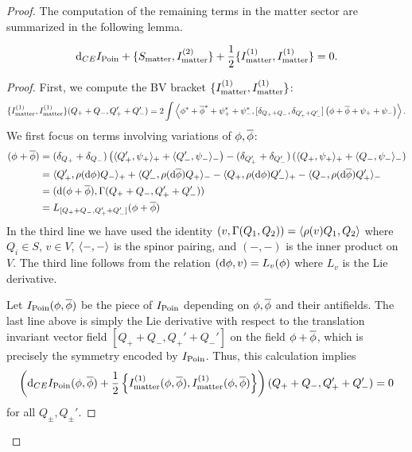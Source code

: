 \documentclass[10pt, oneside]{article}
\begin{document}
\begin{proof}
The computation of the remaining terms in the matter sector are summarized in the following lemma. 
\begin{lem}
\[
\d_{CE} I_{\rm Poin} + \{S_{\rm matter}, I_{\rm matter}^{(2)}\} + \frac{1}{2} \{I_{\rm matter}^{(1)}, I_{\rm matter}^{(1)}\} = 0.
\]
\end{lem}
\begin{proof}

First, we compute the BV bracket $\{I_{\rm matter}^{(1)}, I_{\rm matter}^{(1)}\}$:
\[
\{I^{(1)}_{\rm matter}, I^{(1)}_{\rm matter}\}(Q_+ + Q_-, Q_+' + Q_-') = 2 \int \left\<\phi^* + \Bar{\phi}^* + \psi^*_+ + \psi_-^*, [\delta_{Q_+ + Q_-}, \delta_{Q_+' + Q_-'}] \left(\phi + \Bar{\phi} + \psi_+ + \psi_-\right) \right\>  .
\]
We first focus on terms involving variations of $\phi, \Bar{\phi}$:
\begin{align*} 
[\delta_{Q_+ + Q_-}, \delta_{Q_+' + Q_-'}] (\phi + \Bar{\phi}) & = (\delta_{Q_+} + \delta_{Q_-}) \left(\<Q'_+, \psi_+\>_+ + \<Q'_-, \psi_-\>_-\right) - (\delta_{Q'_+} + \delta_{Q'_-}) \left(\<Q_+, \psi_+\>_+ + \<Q_-, \psi_-\>_-\right) \\ & = \<Q'_+, \rho(\d \phi) Q_-\>_+ + \<Q'_-, \rho(\d \Bar{\phi}) Q_+\>_- -  \<Q_+, \rho(\d \phi) Q'_-\>_+ - \<Q_-, \rho(\d \Bar{\phi}) Q'_+\>_- \\ & = (\d (\phi + \Bar{\phi}), \Gamma(Q_+ + Q_-, Q_+' + Q_-')) \\ & = L_{[Q_++Q_-, Q_+'+Q_-']} (\phi + \Bar{\phi}) %
\end{align*}
In the third line we have used the identity $(v, \Gamma(Q_1, Q_2)) = \<\rho(v) Q_1, Q_2\>$ where $Q_i \in S$, $v \in V$, $\<-,-\>$ is the spinor pairing, and $(-,-)$ is the inner product on $V$. 
The third line follows from the relation $(\d \phi, v) = L_v (\phi)$ where $L_v$ is the Lie derivative. 

Let $I_{\rm Poin}(\phi,\Bar{\phi})$ be the piece of $I_{\rm Poin}$ depending on $\phi, \Bar{\phi}$ and their antifields.
The last line above is simply the Lie derivative with respect to the translation invariant vector field $[Q_++Q_-, Q_+'+Q_-']$ on the field $\phi + \Bar{\phi}$, which is precisely the symmetry encoded by $I_{\rm Poin}$.
Thus, this calculation implies
\[
\left(\d_{CE} I_{\rm Poin}(\phi, \Bar{\phi}) + \frac{1}{2} \left\{I_{\rm matter}^{(1)}(\phi, \Bar{\phi}), I_{\rm matter}^{(1)}(\phi, \Bar{\phi})\right\} \right) (Q_+ + Q_- , Q_+' + Q_-') = 0
\]
for all $Q_\pm, Q_\pm'$. 


\end{proof}
\end{proof}
\end{document}
